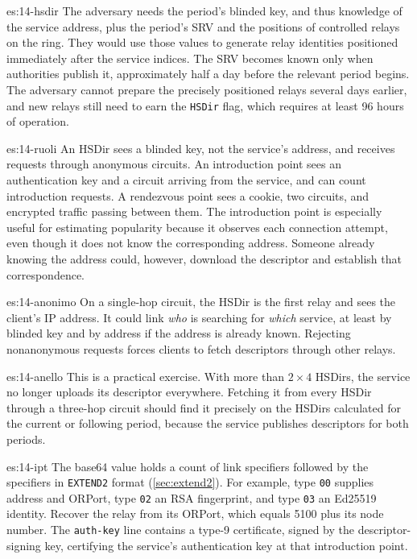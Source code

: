 \begin{soluzione}{es:14-hsdir}
The adversary needs the period's blinded key, and thus knowledge of the service address, plus the period's SRV and the positions of controlled relays on the ring. They would use those values to generate relay identities positioned immediately after the service indices. The SRV becomes known only when authorities publish it, approximately half a day before the relevant period begins. The adversary cannot prepare the precisely positioned relays several days earlier, and new relays still need to earn the \texttt{HSDir} flag, which requires at least 96 hours of operation.
\end{soluzione}

\begin{soluzione}{es:14-ruoli}
An HSDir sees a blinded key, not the service's address, and receives requests through anonymous circuits. An introduction point sees an authentication key and a circuit arriving from the service, and can count introduction requests. A rendezvous point sees a cookie, two circuits, and encrypted traffic passing between them. The introduction point is especially useful for estimating popularity because it observes each connection attempt, even though it does not know the corresponding address. Someone already knowing the address could, however, download the descriptor and establish that correspondence.
\end{soluzione}

\begin{soluzione}{es:14-anonimo}
On a single-hop circuit, the HSDir is the first relay and sees the client's IP address. It could link \emph{who} is searching for \emph{which} service, at least by blinded key and by address if the address is already known. Rejecting nonanonymous requests forces clients to fetch descriptors through other relays.
\end{soluzione}

\begin{soluzione}{es:14-anello}
This is a practical exercise. With more than $2 \times 4$ HSDirs, the service no longer uploads its descriptor everywhere. Fetching it from every HSDir through a three-hop circuit should find it precisely on the HSDirs calculated for the current or following period, because the service publishes descriptors for both periods.
\end{soluzione}

\begin{soluzione}{es:14-ipt}
The base64 value holds a count of link specifiers followed by the specifiers in \texttt{EXTEND2} format (\cref{sec:extend2}). For example, type \texttt{00} supplies address and ORPort, type \texttt{02} an RSA fingerprint, and type \texttt{03} an Ed25519 identity. Recover the relay from its ORPort, which equals 5100 plus its node number. The \texttt{auth-key} line contains a type-9 certificate, signed by the descriptor-signing key, certifying the service's authentication key at that introduction point.
\end{soluzione}
